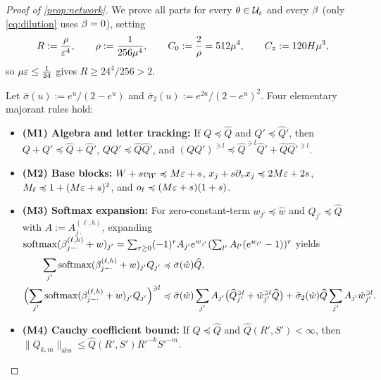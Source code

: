 \begin{proof}[Proof of \cref{prop:network}]
We prove all parts for every $\theta \in \mathcal U_{\varepsilon}$ and every $\beta$ (only \cref{eq:dilution} uses $\beta = 0$), setting
\begin{equation}
  R := \frac{\rho}{\varepsilon^4}, \qquad \rho := \frac{1}{256\mu^4}, \qquad C_0 := \frac{2}{\rho} = 512\mu^4, \qquad C_z := 120 H\mu^3,
  \label{eq:majorant-consts}
\end{equation}
so $\mu\varepsilon \le \frac{1}{24}$ gives $R \ge 24^4/256 > 2$.

Let $\bar\sigma(u) := e^u/(2 - e^u)$ and $\bar\sigma_2(u) := e^{2u}/(2 - e^u)^2$. Four elementary majorant rules hold:
\begin{itemize}[leftmargin=*]
\item \textbf{(M1) Algebra and letter tracking:} If $Q \preccurlyeq \widehat Q$ and $Q' \preccurlyeq \widehat Q'$, then $Q + Q' \preccurlyeq \widehat Q + \widehat Q'$, $QQ' \preccurlyeq \widehat Q\widehat Q'$, and $(QQ')^{\ni l} \preccurlyeq \widehat Q^{\ni l}\widehat Q' + \widehat Q\widehat Q'^{\ni l}$.
\item \textbf{(M2) Base blocks:} $W + s v_W \preccurlyeq M\varepsilon + s$, $x_j + s\partial_v x_j \preccurlyeq 2M\varepsilon + 2s$, $M_\ell \preccurlyeq 1 + (M\varepsilon + s)^2$, and $o_\ell \preccurlyeq (M\varepsilon + s)(1 + s)$.
\item \textbf{(M3) Softmax expansion:} For zero-constant-term $w_{j'} \preccurlyeq \hat w$ and $Q_{j'} \preccurlyeq \widehat Q$ with $A := A_{j\cdot}^{(\ell,h)}$, expanding $\operatorname{softmax}(\beta_{j-\cdot}^{(\ell,h)} + w)_{j'} = \sum_{r\ge 0}(-1)^r A_{j'}e^{w_{j'}}(\sum_{l'}A_{l'}(e^{w_{l'}}-1))^r$ yields
\begin{align*}
  \sum_{j'}\operatorname{softmax}(\beta_{j-\cdot}^{(\ell,h)}+w)_{j'}Q_{j'} &\preccurlyeq \bar\sigma(\hat w)\widehat Q,\\
  \Bigl(\sum_{j'}\operatorname{softmax}(\beta_{j-\cdot}^{(\ell,h)}+w)_{j'}Q_{j'}\Bigr)^{\ni l}
  &\preccurlyeq \bar\sigma(\hat w)\sum_{j'}A_{j'}\bigl(\widehat Q_{j'}^{\ni l} + \hat w_{j'}^{\ni l}\widehat Q\bigr) + \bar\sigma_2(\hat w)\widehat Q\sum_{j'}A_{j'}\hat w_{j'}^{\ni l}.
\end{align*}
\item \textbf{(M4) Cauchy coefficient bound:} If $Q \preccurlyeq \widehat Q$ and $\widehat Q(R', S') < \infty$, then $\|Q_{k,m}\|_{\mathrm{abs}} \le \widehat Q(R', S')R'^{-k}S'^{-m}$.
\end{itemize}


\end{proof}

